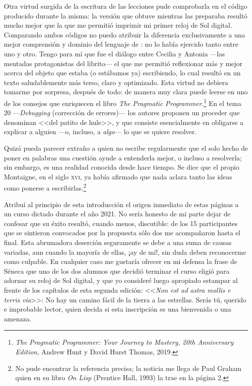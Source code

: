 Otra virtud surgida de la escritura de las lecciones pude comprobarla
en el código producido durante la misma: la versión que obtuve
mientras las preparaba resultó mucho mejor que la que me permitió
imprimir mi primer reloj de Sol digital. Comparando ambos códigos no
puedo atribuir la diferencia exclusivamente a una mejor comprensión y
dominio del lenguaje de \openscad: no lo había ejercido tanto entre
uno y otro. Tengo para mí que fue el diálogo entre Cecilia y Antonia
---las mentadas protagonistas del librito--- el que me permitió
reflexionar más y mejor acerca del objeto que estaba (o estábamos ya)
escribiendo, lo cual resultó en un texto saludablemente más terso,
claro y optimizado. Esta virtud no debiera tomarme por sorpresa,
después de todo: de manera muy clara puede leerse en uno de los
consejos que enriquecen el libro \emph{The Pragmatic
  Programmer}.\footnote{\emph{The Pragmatic Programmer: Your Journey
    to Mastery, 20th Anniversary Edition}, Andrew Hunt y David Hurst
  Thomas, 2019.} En el tema 20 ---\emph{Debugging} (corrección de
errores)--- los autores proponen un proceder que denominan <<del
patito de hule>>, y que consiste esencialmente en obligarse a explicar
a alguien ---o, incluso, a \emph{algo}--- lo que se quiere resolver.

Quizá pueda parecer extraño a quien no escribe regularmente que el
solo hecho de poner en palabras una cuestión ayude a entenderla mejor,
o incluso a resolverla; sin embargo, es una realidad conocida desde
hace tiempo. Se dice que el propio Montaigne, en el siglo
\textsc{xvi}, ya había afirmado que nada aclara tanto las ideas como
ponerse a escribirlas.\footnote{No pude encontrar la referencia
  precisa; la noticia me llega de Paul Graham quien en su libro
  \emph{On Lisp} (Prentice Hall, 1993) la trae en la página 2.}

Atribuí al principio de esta introducción el origen inmediato de estas
páginas a un curso dictado durante el año 2021. No sería honesto de mi
parte dejar de confesar que su éxito resultó, cuando menos,
discutible: de los 15 participantes que se sintieron convocados por la
propuesta sólo dos me acompañaron hasta el final. Esta abrumadora
deserción seguramente se debe a una suma de causas variadas, aun
cuando la mayoría de ellas, ¡ay de mí!, sin duda deben reconocerme
como culpable. En cualquier caso me gustaría ofrecer en mi defensa la
frase de Séneca que uno de los dos alumnos que decidió terminar el
curso eligió para adornar su reloj de Sol digital, y que yo consideré
luego apropiado estampar al frente de los capítulos de esta segunda
edición: <<\emph{Non est ad astra mollis e terris via}>>: No hay un
camino fácil de la tierra a las estrellas. Serás tú, querido e
improbable lector, quien decida si esta inscripción es una bienvenida
o una amenaza.

